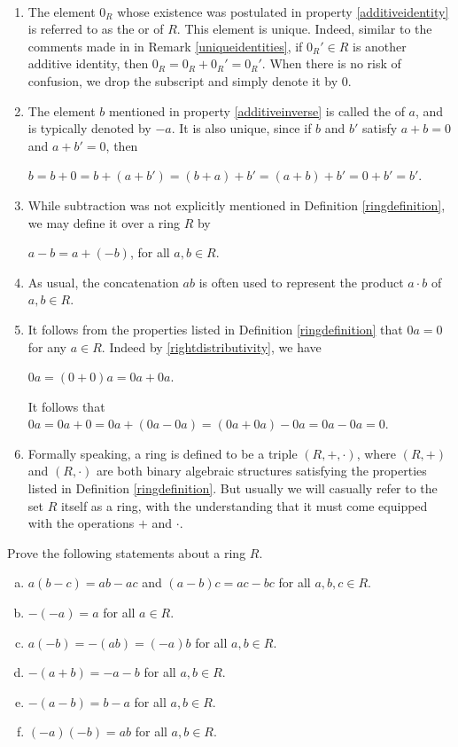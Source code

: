 \documentclass[11pt,fleqn,dvipsnames,usenames]{article}
\begin{document}
\begin{remarks}~
\begin{enumerate}[(1)]
\item The element $0_{R}$ whose existence was postulated in property \ref{additiveidentity} is referred to as the  or  of $R$.  This element is unique.  Indeed, similar to the comments made in in Remark \ref{uniqueidentities}, if $0_{R}'\in R$ is another additive identity, then $0_{R} = 0_{R} + 0_{R}' = 0_{R}'$.  When there is no risk of confusion, we drop the subscript and simply denote it by $0$.

\item The element $b$ mentioned in property \ref{additiveinverse} is called the  of $a$, and is typically denoted by $-a$.  It is also unique, since if $b$ and $b'$ satisfy $a + b = 0$ and $a + b' = 0$, then
\begin{center}
$b = b + 0 = b + (a + b') = (b + a) + b' = (a + b) + b' = 0 + b' = b'$.
\end{center}
\item While subtraction was not explicitly mentioned in Definition \ref{ringdefinition}, we may define it over a ring $R$ by
\begin{center}
$a - b = a + (-b)$, for all $a,b\in R$.
\end{center}
\item As usual, the concatenation $ab$ is often used to represent the product $a\cdot b$ of $a,b\in R$.
\item It follows from the properties listed in Definition \ref{ringdefinition} that $0a = 0$ for any $a\in R$.  Indeed by \ref{rightdistributivity}, we have
\begin{center}
$0a = (0 + 0)a = 0a + 0a$.
\end{center}
It follows that $0a = 0a + 0 = 0a + (0a - 0a) = (0a + 0a) - 0a = 0a - 0a = 0$.
\item Formally speaking, a ring is defined to be a triple $(R,+,\cdot)$, where $(R,+)$ and $(R,\cdot)$ are both binary algebraic structures satisfying the properties listed in Definition \ref{ringdefinition}.  But usually we will casually refer to the set $R$ itself as a ring, with the understanding that it must come equipped with the operations $+$ and $\cdot$.
\end{enumerate}
\end{remarks}
%
\begin{exercises}\label{ringpropertyexercises} Prove the following statements about a ring $R$.
\begin{enumerate}[(a)]
\item $a(b-c) = ab - ac$ and $(a-b)c = ac - bc$ for all $a,b,c\in R$.
\item $-(-a) = a$ for all $a\in R$.
\item $a(-b) = -(ab) = (-a)b$ for all $a,b\in R$.\label{negativeproduct}
\item $-(a+b) = -a - b$ for all $a,b\in R$.
\item $-(a-b) = b-a$ for all $a,b\in R$.
\item $(-a)(-b) = ab$ for all $a,b\in R$.
\end{enumerate}
\end{exercises}
\end{document}

